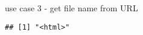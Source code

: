 \documentclass[ignorenonframetext,]{beamer}
\begin{document}
\begin{frame}[fragile]{use case 3 - get file name from URL}
\begin{verbatim}
## [1] "<html>"                                                                                                                                                                                                                                                                                                                                                                                                                                                                                                                                                                                                                                                                                                                                                                                                                                                                                                                                                                                                                                                                                                                                                                                                                                                                                                                                                                                                                                                                                                                                                                                                                                                                                                                                                                                                                                                                                                                                                                                                                                                        

\end{verbatim}
\end{frame}
\end{document}
